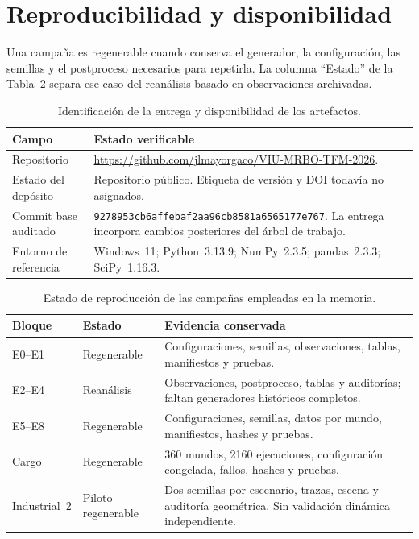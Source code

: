 \section{Reproducibilidad y disponibilidad}
\label{app:reproducibility}

Una campaña es regenerable cuando conserva el generador, la configuración, las
semillas y el postproceso necesarios para repetirla. La columna ``Estado'' de la
Tabla~\ref{tab:reproducibility-status} separa ese caso del reanálisis basado en
observaciones archivadas.

\begin{table}[!htbp]
  \centering
  \caption{Identificación de la entrega y disponibilidad de los artefactos.}
  \label{tab:deposit-identification}
  \viutablefont
  \setlength{\tabcolsep}{3pt}
  \begin{tabularx}{\textwidth}{@{}p{3.1cm}X@{}}
    \toprule
    Campo & Estado verificable \\
    \midrule
    Repositorio & \url{https://github.com/jlmayorgaco/VIU-MRBO-TFM-2026}. \\
    Estado del depósito & Repositorio público. Etiqueta de versión y DOI todavía no asignados. \\
    Commit base auditado & \texttt{9278953cb6affebaf2aa96cb8581a6565177e767}. La entrega incorpora cambios posteriores del árbol de trabajo. \\
    Entorno de referencia & Windows~11; Python~3.13.9; NumPy~2.3.5; pandas~2.3.3; SciPy~1.16.3. \\
    \bottomrule
  \end{tabularx}
  \viuownsource
\end{table}

\begin{table}[!htbp]
  \centering
  \caption{Estado de reproducción de las campañas empleadas en la memoria.}
  \label{tab:reproducibility-status}
  \viutablefont
  \setlength{\tabcolsep}{3pt}
  \begin{tabularx}{\textwidth}{@{}p{2.3cm}p{2.4cm}X@{}}
    \toprule
    Bloque & Estado & Evidencia conservada \\
    \midrule
    E0--E1 & Regenerable & Configuraciones, semillas, observaciones, tablas, manifiestos y pruebas. \\
    E2--E4 & Reanálisis & Observaciones, postproceso, tablas y auditorías; faltan generadores históricos completos. \\
    E5--E8 & Regenerable & Configuraciones, semillas, datos por mundo, manifiestos, hashes y pruebas. \\
    Cargo & Regenerable & 360 mundos, 2160 ejecuciones, configuración congelada, fallos, hashes y pruebas. \\
    Industrial~2 & Piloto regenerable & Dos semillas por escenario, trazas, escena y auditoría geométrica. Sin validación dinámica independiente. \\
    \bottomrule
  \end{tabularx}
  \viuownsource
\end{table}

